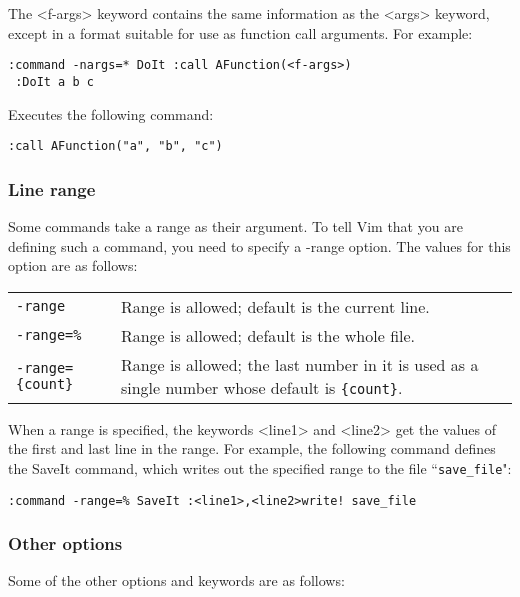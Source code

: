 The <f-args> keyword contains the same information as the <args> keyword, except in a format suitable for use as function call arguments.
For example:

\begin{Verbatim}[samepage=true]
 :command -nargs=* DoIt :call AFunction(<f-args>)
 :DoIt a b c
\end{Verbatim}

Executes the following command:

\begin{Verbatim}[samepage=true]
 :call AFunction("a", "b", "c")
\end{Verbatim}

\subsubsection{Line range}
Some commands take a range as their argument.
To tell Vim that you are defining such a command, you need to specify a -range option.
The values for this option are as follows:

\begin{center} \begin{tabularx}{0.75\textwidth}{l X}
				\texttt{-range} & Range is allowed; default is the current line. \\
				\texttt{-range=\%} & Range is allowed; default is the whole file. \\
				\texttt{-range=\{count\}} & Range is allowed; the last number in it is used as a single number whose default is \texttt{\{count\}}. \\
\end{tabularx} \end{center}

When a range is specified, the keywords <line1> and <line2> get the values of the first and last line in the range.
For example, the following command defines the SaveIt command, which writes out the specified range to the file ``\texttt{save\_file}":

\begin{Verbatim}[samepage=true]
 :command -range=% SaveIt :<line1>,<line2>write! save_file
\end{Verbatim}
\subsubsection{Other options}
Some of the other options and keywords are as follows:

